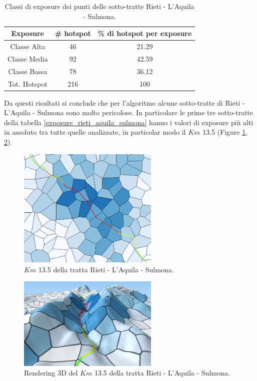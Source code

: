 \begin{table}[H]
	\centering
	\begin{tabular}{|c|c|c|}
		\hline
		\rowcolor[HTML]{C0C0C0} 
		\textbf{Exposure} & \textbf{\# hotspot} & \textbf{\% di hotspot per exposure} \\ \hline
		Classe Alta       & 46                  & 21.29                                   \\ \hline
		Classe Media      & 92                 & 42.59                         \\ \hline
		Classe Bassa      & 78              & 36.12                            \\ \hline
		Tot. Hotspot      & 216               & 100                                 \\ \hline
	\end{tabular}
	\caption{Classi di exposure dei punti delle sotto-tratte Rieti - L'Aquila - Sulmona.}
	\label{risultati_rieti_aquila_sulmona}
\end{table}
Da questi risultati si conclude che per l'algoritmo alcune sotto-tratte di Rieti - L'Aquila - Sulmona sono molto pericolose.
In particolare le prime tre sotto-tratte della tabella \ref{exposure_rieti_aquila_sulmona} hanno i valori di exposure più alti in assoluto tra tutte quelle analizzate, in particolar modo il $Km$ 13.5 (Figure \ref{km_13}, \ref{km_13d}). 

\begin{figure}[h]
	\centering
	\includegraphics[width=0.6\textwidth]{images/rietizoom}
	\caption{$Km$ 13.5 della tratta Rieti - L'Aquila - Sulmona.}
	\label{km_13}
\end{figure}

\begin{figure}[h]
	\centering
	\includegraphics[width=0.6\textwidth]{images/rieti3d}
	\caption{Rendering 3D del $Km$ 13.5 della tratta Rieti - L'Aquila - Sulmona.}
	\label{km_13d}
\end{figure}


